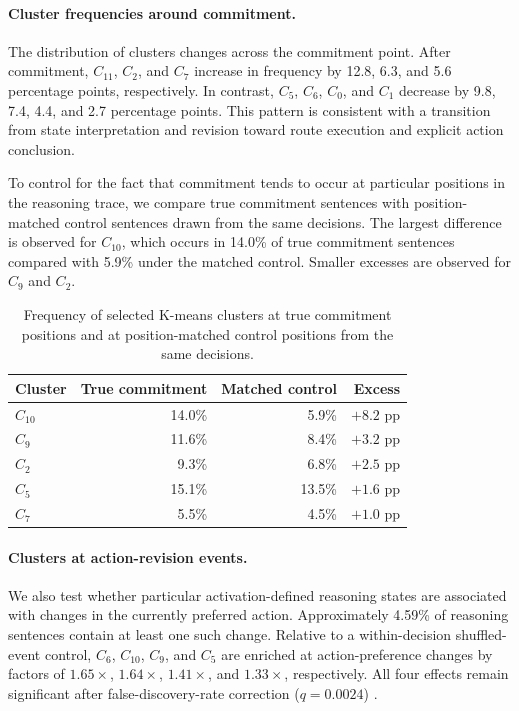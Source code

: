 \documentclass{article}
\begin{document}
\paragraph{Cluster frequencies around commitment.}
The distribution of clusters changes across the commitment point. After
commitment, \(C_{11}\), \(C_2\), and \(C_7\) increase in frequency by
12.8, 6.3, and 5.6 percentage points, respectively. In contrast, \(C_5\),
\(C_6\), \(C_0\), and \(C_1\) decrease by 9.8, 7.4, 4.4, and 2.7 percentage
points. This pattern is consistent with a transition from state
interpretation and revision toward route execution and explicit action
conclusion.

To control for the fact that commitment tends to occur at particular
positions in the reasoning trace, we compare true commitment sentences with
position-matched control sentences drawn from the same decisions. The largest
difference is observed for \(C_{10}\), which occurs in 14.0\% of true
commitment sentences compared with 5.9\% under the matched control. Smaller
excesses are observed for \(C_9\) and \(C_2\).

\begin{table}[htbp]
\centering
\small
\begin{tabular}{lrrr}
\toprule
Cluster & True commitment & Matched control & Excess \\
\midrule
\(C_{10}\) & 14.0\% & 5.9\% & \(+8.2\) pp \\
\(C_9\)    & 11.6\% & 8.4\% & \(+3.2\) pp \\
\(C_2\)    & 9.3\% & 6.8\% & \(+2.5\) pp \\
\(C_5\)    & 15.1\% & 13.5\% & \(+1.6\) pp \\
\(C_7\)    & 5.5\% & 4.5\% & \(+1.0\) pp \\
\bottomrule
\end{tabular}
\caption{Frequency of selected K-means clusters at true commitment positions
and at position-matched control positions from the same decisions.}
\label{tab:commitment-clusters-app}
\end{table}


\paragraph{Clusters at action-revision events.}
We also test whether particular activation-defined reasoning states are
associated with changes in the currently preferred action. Approximately
4.59\% of reasoning sentences contain at least one such change. Relative to
a within-decision shuffled-event control, \(C_6\), \(C_{10}\), \(C_9\), and
\(C_5\) are enriched at action-preference changes by factors of
\(1.65\times\), \(1.64\times\), \(1.41\times\), and \(1.33\times\),
respectively. All four effects remain significant after false-discovery-rate
correction (\(q=0.0024\)) \cite{benjamini1995controlling}.
\end{document}
